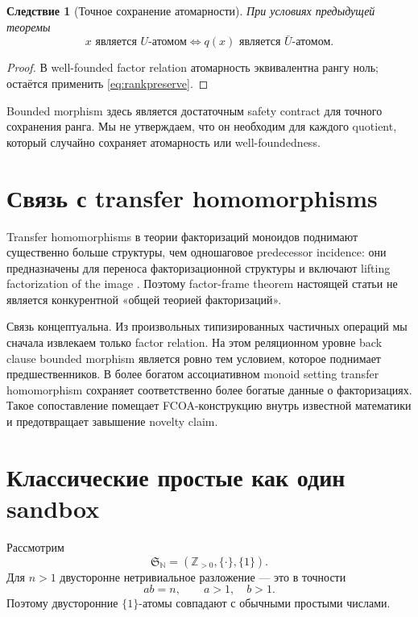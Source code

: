 \documentclass[11pt]{article}
\newtheorem{corollary}[theorem]{Следствие}
\theoremstyle{definition}
\theoremstyle{remark}
\newcommand{\Sbx}{\mathfrak S}
\begin{document}
\begin{corollary}[Точное сохранение атомарности]
При условиях предыдущей теоремы
\begin{equation}
\boxed{x\text{ является }U\text{-атомом}\iff q(x)\text{ является }\bar U\text{-атомом}.}
\end{equation}
\end{corollary}

\begin{proof}
В well-founded factor relation атомарность эквивалентна рангу ноль; остаётся применить \eqref{eq:rankpreserve}.
\end{proof}

Bounded morphism здесь является достаточным safety contract для точного сохранения ранга. Мы не утверждаем, что он необходим для каждого quotient, который случайно сохраняет атомарность или well-foundedness.

\section{Связь с transfer homomorphisms}

Transfer homomorphisms в теории факторизаций моноидов поднимают существенно больше структуры, чем одношаговое predecessor incidence: они предназначены для переноса факторизационной структуры и включают lifting factorization of the image \cite{GeroldingerHalterKoch2006}. Поэтому factor-frame theorem настоящей статьи не является конкурентной «общей теорией факторизаций».

Связь концептуальна. Из произвольных типизированных частичных операций мы сначала извлекаем только factor relation. На этом реляционном уровне back clause bounded morphism является ровно тем условием, которое поднимает предшественников. В более богатом ассоциативном monoid setting transfer homomorphism сохраняет соответственно более богатые данные о факторизациях. Такое сопоставление помещает FCOA-конструкцию внутрь известной математики и предотвращает завышение novelty claim.

\section{Классические простые как один sandbox}

Рассмотрим
\begin{equation}
\Sbx_{\mathbb N}=(\mathbb Z_{>0},\{\cdot\},\{1\}).
\label{eq:classical}
\end{equation}
Для \(n>1\) двусторонне нетривиальное разложение — это в точности
\[
ab=n,\qquad a>1,\quad b>1.
\]
Поэтому двусторонние \(\{1\}\)-атомы совпадают с обычными простыми числами.
\end{document}

